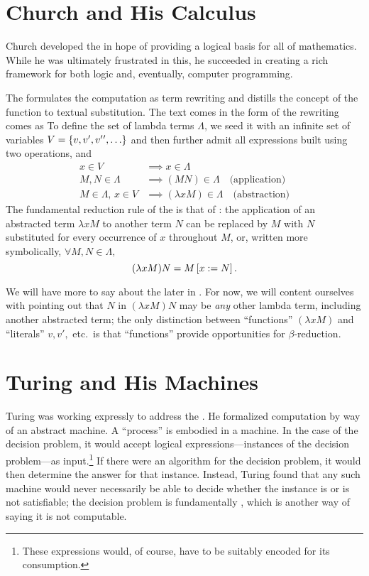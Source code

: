 \section{Church and His Calculus}
Church developed the \lambdacalc in hope of providing a logical basis for all of mathematics. While he was ultimately frustrated in this, he succeeded in creating a rich framework for both logic and, eventually, computer programming.

The \lambdacalc formulates the computation as term rewriting and distills the concept of the function to textual substitution. The text comes in the form of  the rewriting comes as  To define the set of lambda terms $\Lambda$, we seed it with an infinite set of variables $V = \set{v, v\prime, v\prime\prime, \dotsc}$ and then further admit all expressions built using two operations,  and 
\begin{align*}
x \in V &\implies x \in \Lambda\\
M,N \in \Lambda &\implies (MN) \in \Lambda \quad\text{(application)}\\
M \in \Lambda,\, x \in V &\implies (\lambda x M) \in \Lambda \quad\text{(abstraction)}
\end{align*}
The fundamental reduction rule of the \lambdacalc is that of : the application of an abstracted term $\lambda x M$ to another term $N$ can be replaced by $M$ with $N$ substituted for every occurrence of $x$ throughout $M$, or, written more symbolically, $\forall M,N \in \Lambda,$
\[
(\lambda x M)N = \replace{x}{N}{M}.
\]

We will have more to say about the \lambdacalc later in . For now, we will content ourselves with pointing out that $N$ in $(\lambda x M)N$ may be \emph{any} other lambda term, including another abstracted term; the only distinction between ``functions'' $(\lambda x M)$ and ``literals'' $v, v\prime,$ etc.\ is that ``functions'' provide opportunities for $\beta$-reduction.

\section{Turing and His Machines}
Turing was working expressly to address the . He formalized computation by way of an abstract machine. A ``process'' is embodied in a machine. In the case of the decision problem, it would accept logical expressions---instances of the decision problem---as input.\footnote{These expressions would, of course, have to be suitably encoded for its consumption.} If there were an algorithm for the decision problem, it would then determine the answer for that instance. Instead, Turing found that any such machine would never necessarily be able to decide whether the instance is or is not satisfiable; the decision problem is fundamentally , which is another way of saying it is not computable.

